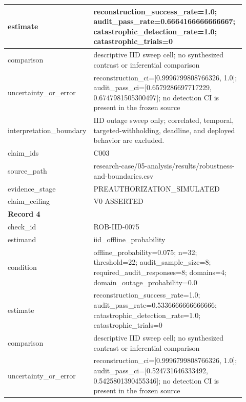 \begin{longtable}{|p{0.24\linewidth}|p{0.68\linewidth}|}
estimate & reconstruction\_\allowbreak{}success\_\allowbreak{}rate=1.0;\allowbreak{} audit\_\allowbreak{}pass\_\allowbreak{}rate=0.6664166666666667;\allowbreak{} catastrophic\_\allowbreak{}detection\_\allowbreak{}rate=1.0;\allowbreak{} catastrophic\_\allowbreak{}trials=0 \\ \hline
comparison & descriptive IID sweep cell;\allowbreak{} no synthesized contrast or inferential comparison \\ \hline
uncertainty\_\allowbreak{}or\_\allowbreak{}error & reconstruction\_\allowbreak{}ci=[0.9996799808766326, 1.0];\allowbreak{} audit\_\allowbreak{}pass\_\allowbreak{}ci=[0.6579286697717229, 0.6747981505300497];\allowbreak{} no detection CI is present in the frozen source \\ \hline
interpretation\_\allowbreak{}boundary & IID outage sweep only;\allowbreak{} correlated, temporal, targeted-withholding, deadline, and deployed behavior are excluded. \\ \hline
claim\_\allowbreak{}ids & C003 \\ \hline
source\_\allowbreak{}path & research-case/05-analysis/results/robustness-and-boundaries.csv \\ \hline
evidence\_\allowbreak{}stage & PREAUTHORIZATION\_\allowbreak{}SIMULATED \\ \hline
claim\_\allowbreak{}ceiling & V0 ASSERTED \\ \hline
\multicolumn{2}{|l|}{\textbf{Record 4}} \\ \hline
check\_\allowbreak{}id & ROB-IID-0075 \\ \hline
estimand & iid\_\allowbreak{}offline\_\allowbreak{}probability \\ \hline
condition & offline\_\allowbreak{}probability=0.075;\allowbreak{} n=32;\allowbreak{} threshold=22;\allowbreak{} audit\_\allowbreak{}sample\_\allowbreak{}size=8;\allowbreak{} required\_\allowbreak{}audit\_\allowbreak{}responses=8;\allowbreak{} domains=4;\allowbreak{} domain\_\allowbreak{}outage\_\allowbreak{}probability=0.0 \\ \hline
estimate & reconstruction\_\allowbreak{}success\_\allowbreak{}rate=1.0;\allowbreak{} audit\_\allowbreak{}pass\_\allowbreak{}rate=0.5336666666666666;\allowbreak{} catastrophic\_\allowbreak{}detection\_\allowbreak{}rate=1.0;\allowbreak{} catastrophic\_\allowbreak{}trials=0 \\ \hline
comparison & descriptive IID sweep cell;\allowbreak{} no synthesized contrast or inferential comparison \\ \hline
uncertainty\_\allowbreak{}or\_\allowbreak{}error & reconstruction\_\allowbreak{}ci=[0.9996799808766326, 1.0];\allowbreak{} audit\_\allowbreak{}pass\_\allowbreak{}ci=[0.524731646333492, 0.5425801390455346];\allowbreak{} no detection CI is present in the frozen source \\ \hline

\end{longtable}
